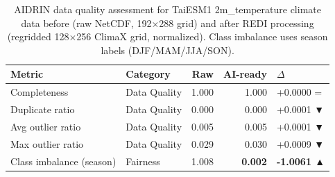 \begin{table}[t]
\centering
\caption{AIDRIN data quality assessment for TaiESM1 2m\_temperature climate data before (raw NetCDF, 192$\times$288 grid) and after REDI processing (regridded 128$\times$256 ClimaX grid, normalized). Class imbalance uses season labels (DJF/MAM/JJA/SON).}
\label{tab:aidrin_climate}
\begin{tabular}{llrrl}
\toprule
\textbf{Metric} & \textbf{Category} & \textbf{Raw} & \textbf{AI-ready} & \textbf{$\Delta$} \\
\midrule
  Completeness & Data Quality & 1.000 & 1.000 & +0.0000 = \\
  Duplicate ratio & Data Quality & 0.000 & 0.000 & +0.0001 ▼ \\
  Avg outlier ratio & Data Quality & 0.005 & 0.005 & +0.0001 ▼ \\
  Max outlier ratio & Data Quality & 0.029 & 0.030 & +0.0009 ▼ \\
  Class imbalance (season) & Fairness & 1.008 & \textbf{0.002} & \textbf{-1.0061 ▲} \\
\bottomrule
\end{tabular}
\end{table}
